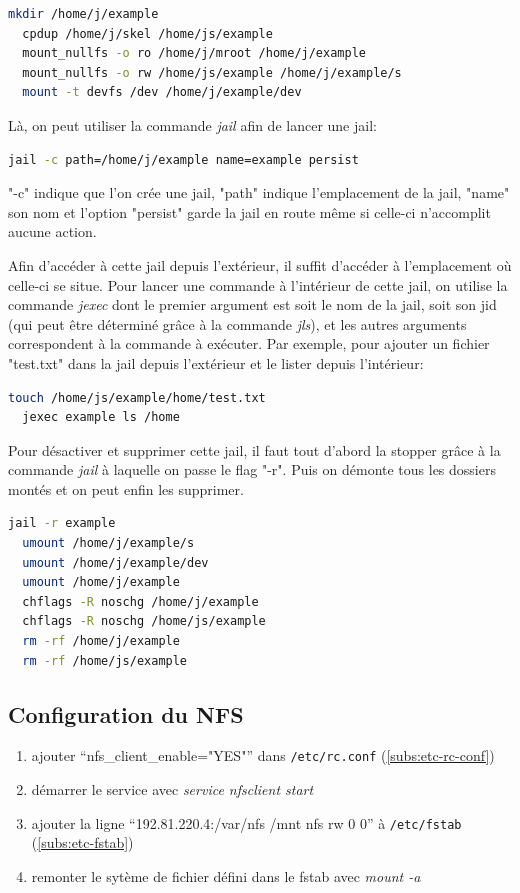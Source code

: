 \documentclass[10pt,a4paper]{article}
\begin{document}
\begin{lstlisting}[language=bash]
  mkdir /home/j/example
  cpdup /home/j/skel /home/js/example
  mount_nullfs -o ro /home/j/mroot /home/j/example
  mount_nullfs -o rw /home/js/example /home/j/example/s
  mount -t devfs /dev /home/j/example/dev
\end{lstlisting}
Là, on peut utiliser la commande \emph{jail} afin de lancer une jail:
\begin{lstlisting}[language=bash]
  jail -c path=/home/j/example name=example persist
\end{lstlisting}
"-c" indique que l'on crée une jail, "path" indique l'emplacement de la jail,
"name" son nom et l'option "persist" garde la jail en route même si celle-ci n'accomplit aucune action.

Afin d'accéder à cette jail depuis l'extérieur, il suffit d'accéder à l'emplacement où celle-ci se situe.
Pour lancer une commande à l'intérieur de cette jail,
on utilise la commande \emph{jexec} dont le premier argument est soit le nom de la jail,
soit son jid (qui peut être déterminé grâce à la commande \emph{jls}),
et les autres arguments correspondent à la commande à exécuter.
Par exemple, pour ajouter un fichier "test.txt" dans la jail depuis l'extérieur et le lister depuis l'intérieur:
\begin{lstlisting}[language=bash]
  touch /home/js/example/home/test.txt
  jexec example ls /home
\end{lstlisting}

Pour désactiver et supprimer cette jail, il faut tout d'abord la stopper grâce à la commande \emph{jail} à laquelle on passe le flag "-r".
Puis on démonte tous les dossiers montés et on peut enfin les supprimer.
\begin{lstlisting}[language=bash]
  jail -r example
  umount /home/j/example/s
  umount /home/j/example/dev
  umount /home/j/example
  chflags -R noschg /home/j/example
  chflags -R noschg /home/js/example
  rm -rf /home/j/example
  rm -rf /home/js/example
\end{lstlisting}

\subsection{Configuration du NFS}
\begin{enumerate}
  \item ajouter ``nfs\_client\_enable="YES"'' dans \texttt{/etc/rc.conf} (\ref{subs:etc-rc-conf})
  \item démarrer le service avec \emph{service nfsclient start}
  \item ajouter la ligne ``192.81.220.4:/var/nfs        /mnt        nfs        rw        0        0'' à \texttt{/etc/fstab} (\ref{subs:etc-fstab})
  \item remonter le sytème de fichier défini dans le fstab avec \emph{mount -a}
\end{enumerate}
\end{document}
